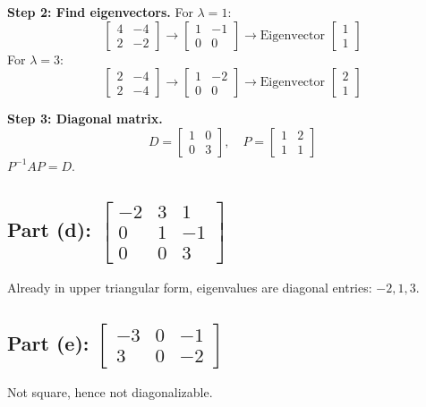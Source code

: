\documentclass[12pt]{article}
\begin{document}
\textbf{Step 2: Find eigenvectors.} For \(\lambda = 1\):
\[
\begin{bmatrix}
4 & -4 \\
2 & -2
\end{bmatrix} \rightarrow \begin{bmatrix} 1 & -1 \\ 0 & 0 \end{bmatrix} \rightarrow \text{Eigenvector } \begin{bmatrix} 1 \\ 1 \end{bmatrix}
\]
For \(\lambda = 3\):
\[
\begin{bmatrix}
2 & -4 \\
2 & -4
\end{bmatrix} \rightarrow \begin{bmatrix} 1 & -2 \\ 0 & 0 \end{bmatrix} \rightarrow \text{Eigenvector } \begin{bmatrix} 2 \\ 1 \end{bmatrix}
\]

\textbf{Step 3: Diagonal matrix.}
\[
D = \begin{bmatrix} 1 & 0 \\ 0 & 3 \end{bmatrix}, \quad P = \begin{bmatrix} 1 & 2 \\ 1 & 1 \end{bmatrix}
\]
\(P^{-1}AP = D\).

\subsection*{Part (d): \( \begin{bmatrix} -2 & 3 & 1 \\ 0 & 1 & -1 \\ 0 & 0 & 3 \end{bmatrix} \)}
Already in upper triangular form, eigenvalues are diagonal entries: \(-2, 1, 3\).

\subsection*{Part (e): \( \begin{bmatrix} -3 & 0 & -1 \\ 3 & 0 & -2 \end{bmatrix} \)}
Not square, hence not diagonalizable.
\end{document}
